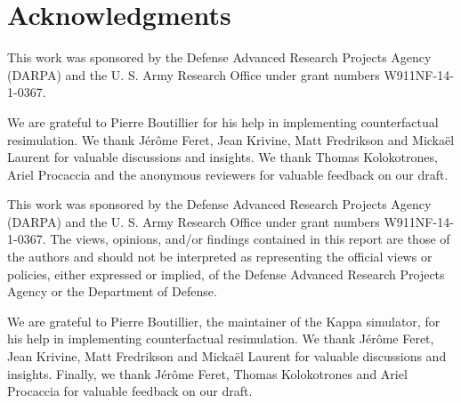 \section*{Acknowledgments}

\ifshort
This work was sponsored by the Defense Advanced Research Projects
Agency (DARPA) and the U. S. Army Research Office under grant numbers
W911NF-14-1-0367.

We are grateful to Pierre Boutillier for his help in implementing
counterfactual resimulation. We thank J\'{e}r\^{o}me Feret, Jean
Krivine, Matt Fredrikson and Micka\"{e}l Laurent for valuable
discussions and insights. We thank Thomas Kolokotrones, Ariel
Procaccia and the anonymous reviewers for valuable feedback on our
draft.

\else

This work was sponsored by the Defense Advanced Research Projects
Agency (DARPA) and the U. S. Army Research Office under grant numbers
W911NF-14-1-0367.  The views, opinions, and/or findings
contained in this report are those of the authors and should not be
interpreted as representing the official views or policies, either
expressed or implied, of the Defense Advanced Research Projects Agency
or the Department of Defense. 

We are grateful to Pierre Boutillier, the maintainer of the Kappa
simulator, for his help in implementing counterfactual resimulation.
We thank J\'{e}r\^{o}me Feret, Jean Krivine, Matt Fredrikson and
Micka\"{e}l Laurent for valuable discussions and insights.  Finally,
we thank J\'{e}r\^{o}me Feret, Thomas Kolokotrones and Ariel Procaccia
for valuable feedback on our draft.
\fi
